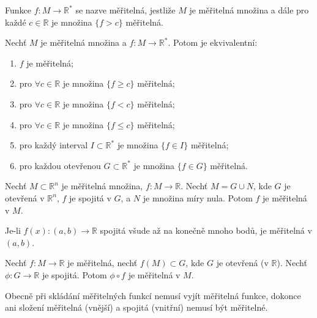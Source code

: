 \begin{definice}
Funkce $f : M \to \mathbb{R}^*$ se nazve měřitelná, jestliže $M$ je
měřitelná množina a dále pro každé $c \in \mathbb{R}$ je množina
$\{f > c\}$ měřitelná.
\end{definice}

\begin{lemma}
Nechť $M$ je měřitelná množina a $f : M \to \mathbb{R}^*$. Potom je
ekvivalentní:
\begin{enumerate}[1.]
\item $f$ je měřitelná;
\item pro $\forall c \in \mathbb{R}$ je množina $\{f \ge c\}$
měřitelná;
\item pro $\forall c \in \mathbb{R}$ je množina $\{f < c\}$
měřitelná;
\item pro $\forall c \in \mathbb{R}$ je množina $\{f \le c\}$
měřitelná;
\item pro každý interval $I \subset \mathbb{R}^*$ je množina
$\{f \in I\}$ měřitelná;
\item pro každou otevřenou $G \subset \mathbb{R}^*$ je množina
$\{f \in G\}$ měřitelná.
\end{enumerate}
\end{lemma}

\begin{lemma}
Nechť $M \subset \mathbb{R}^n$ je měřitelná množina, $f : M \to
\mathbb{R}$. Nechť $M = G \cup N$, kde $G$ je otevřená v
$\mathbb{R}^n$, $f$ je spojitá v $G$, a $N$ je množina míry nula.
Potom $f$ je měřitelná v $M$.
\end{lemma}

\begin{dusledek}
Je-li $f(x) \colon (a, b) \to \mathbb{R}$ spojitá všude až na konečně
mnoho bodů, je měřitelná v $(a, b)$.
\end{dusledek}

\begin{lemma}
Nechť $f \colon M \to \mathbb{R}$ je měřitelná, nechť $f(M) \subset G$, kde
$G$ je otevřená (v $\mathbb{R}$). Nechť $\phi \colon G \to \mathbb{R}$ je
spojitá. Potom $\phi \circ f$ je měřitelná v $M$.
\end{lemma}

\begin{poznamka}
Obecně při skládání měřitelných funkcí nemusí vyjít měřitelná funkce,
dokonce ani složení měřitelná (vnější) a spojitá (vnitřní) nemusí být
měřitelné.
\end{poznamka}

